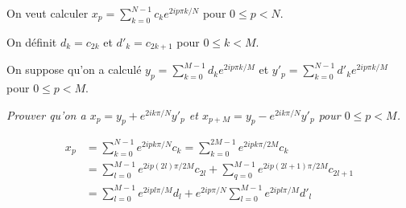 On veut calculer $\displaystyle x_p=\sum_{k=0}^{N-1}c_ke^{2ip\pi k/N}$ pour $0\le p < N$.

On définit $d_k=c_{2k}$ et $d'_k=c_{2k+1}$ pour $0\le k< M$.

On suppose qu'on a calculé $\displaystyle y_p=\sum_{k=0}^{M-1}d_ke^{2ip\pi k/M}$ et $\displaystyle y'_p=\sum_{k=0}^{N-1}d'_ke^{2ip\pi k/M}$ pour $0\le p < M$.
\begin{Exercise}\it 
Prouver qu'on a $x_p = y_p+e^{2ik\pi/N}y'_p$ et $x_{p+M} = y_p-e^{2ik\pi/N}y'_p$ pour $0\le p < M$.
\end{Exercise}
\begin{Answer}
\begin{align*}
x_p
&
=\sum_{k=0}^{N-1} e^{2ipk\pi/N}c_k
=\sum_{k=0}^{2M-1} e^{2ipk\pi/2M}c_k
\\ &
=\sum_{l=0}^{M-1} e^{2ip(2l)\pi/2M}c_{2l} + \sum_{q=0}^{M-1} e^{2ip(2l+1)\pi/2M}c_{2l+1}
\\ &
=\sum_{l=0}^{M-1} e^{2ipl\pi/M}d_l + e^{2ip\pi/N}\sum_{l=0}^{M-1} e^{2ipl\pi/M}d'_l
\end{align*}
\newpage
\end{Answer}
